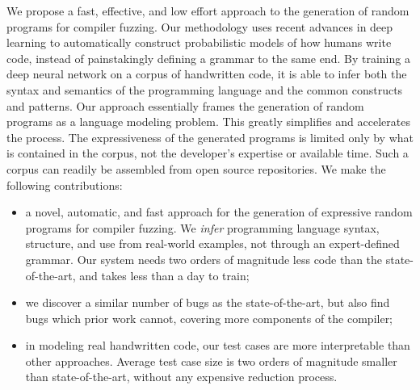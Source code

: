 We propose a fast, effective, and low effort approach to the generation of random programs for compiler fuzzing. Our methodology uses recent advances in deep learning to automatically construct probabilistic models of how humans write code, instead of painstakingly defining a grammar to the same end. By training a deep neural network on a corpus of handwritten code, it is able to infer both the syntax and semantics of the programming language and the common constructs and patterns. Our approach essentially frames the generation of random programs as a language modeling problem. This greatly simplifies and accelerates the process. The expressiveness of the generated programs is limited only by what is contained in the corpus, not the developer's expertise or available time. Such a corpus can readily be assembled from open source repositories. We make the following contributions:
\vspace{-.2em}
\begin{itemize}
\itemsep0em 
\item a novel, automatic, and fast approach for the generation of expressive random programs for compiler fuzzing. We \emph{infer} programming language syntax, structure, and use from real-world examples, not through an expert-defined grammar. Our system needs two orders of magnitude less code than the state-of-the-art, and takes less than a day to train;
\item we discover a similar number of bugs as the state-of-the-art, but also find bugs which prior work cannot, covering more components of the compiler;
\item in modeling real handwritten code, our test cases are more interpretable than other approaches. Average test case size is two orders of magnitude smaller than state-of-the-art, without any expensive reduction process.
\end{itemize}
